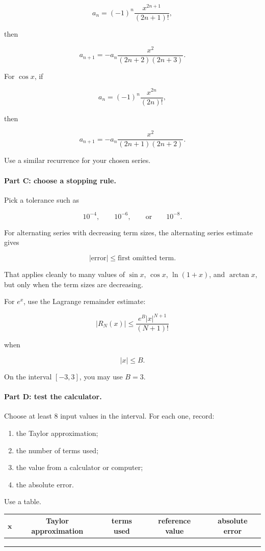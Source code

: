 \[
a_n=(-1)^n\frac{x^{2n+1}}{(2n+1)!},
\]

then

\[
\boxed{
a_{n+1}
=
-a_n
\frac{x^2}{(2n+2)(2n+3)}.
}
\]

For \(\cos x\), if

\[
a_n=(-1)^n\frac{x^{2n}}{(2n)!},
\]

then

\[
\boxed{
a_{n+1}
=
-a_n
\frac{x^2}{(2n+1)(2n+2)}.
}
\]

Use a similar recurrence for your chosen series.

\paragraph{Part C: choose a stopping rule.}
Pick a tolerance such as

\[
10^{-4},\qquad 10^{-6},\qquad \text{or}\qquad 10^{-8}.
\]

For alternating series with decreasing term sizes, the alternating series estimate gives

\[
\boxed{
|\text{error}|\le \text{first omitted term}.
}
\]

That applies cleanly to many values of \(\sin x\), \(\cos x\), \(\ln(1+x)\), and
\(\arctan x\), but only when the term sizes are decreasing.

For \(e^x\), use the Lagrange remainder estimate:

\[
\boxed{
|R_N(x)|
\le
\frac{e^B |x|^{N+1}}{(N+1)!}
}
\]

when

\[
|x|\le B.
\]

On the interval \([-3,3]\), you may use \(B=3\).

\paragraph{Part D: test the calculator.}
Choose at least \(8\) input values in the interval.  For each one, record:

\begin{enumerate}
\item the Taylor approximation;
\item the number of terms used;
\item the value from a calculator or computer;
\item the absolute error.
\end{enumerate}

Use a table.

\begin{center}
\renewcommand{\arraystretch}{1.35}
\begin{tabular}{c|c|c|c|c}
\(\boldsymbol{x}\) &
\textbf{Taylor approximation} &
\textbf{terms used} &
\textbf{reference value} &
\textbf{absolute error} \\ \hline
 & & & & \\
 & & & & \\
 & & & &
\end{tabular}
\end{center}

